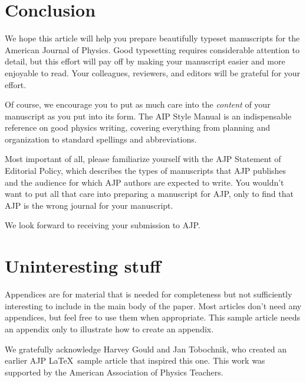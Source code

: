 \documentclass[prb,preprint]{revtex4-1}
\begin{document}
\section{Conclusion}

We hope this article will help you prepare beautifully typeset
manuscripts for the American Journal of Physics.  Good typesetting requires
considerable attention to detail, but this effort will pay off by making your
manuscript easier and more enjoyable to read.  Your colleagues, reviewers, 
and editors will be grateful for your effort.

Of course, we encourage you to put as much care into the \textit{content} 
of your manuscript as you put into its form.  The AIP Style 
Manual\cite{AIPstylemanual} is an indispensable reference on good physics 
writing, covering everything from planning and organization to standard 
spellings and abbreviations.

Most important of all, please familiarize yourself with the AJP Statement
of Editorial Policy,\cite{editorsite} which describes the types of manuscripts 
that AJP publishes and the audience for which AJP authors are expected to write.
You wouldn't want to put all that care into preparing a manuscript for AJP,
only to find that AJP is the wrong journal for your manuscript.

We look forward to receiving your submission to AJP.


\appendix*   %

\section{Uninteresting stuff}

Appendices are for material that is needed for completeness but
not sufficiently interesting to include in the main body of the paper.  Most
articles don't need any appendices, but feel free to use them when
appropriate.  This sample article needs an appendix only to illustrate how 
to create an appendix.


\begin{acknowledgments}

We gratefully acknowledge Harvey Gould and Jan Tobochnik, who created an earlier 
AJP \LaTeX\ sample article that inspired this one.  This work was supported by the 
American Association of Physics Teachers.

\end{acknowledgments}
\end{document}
